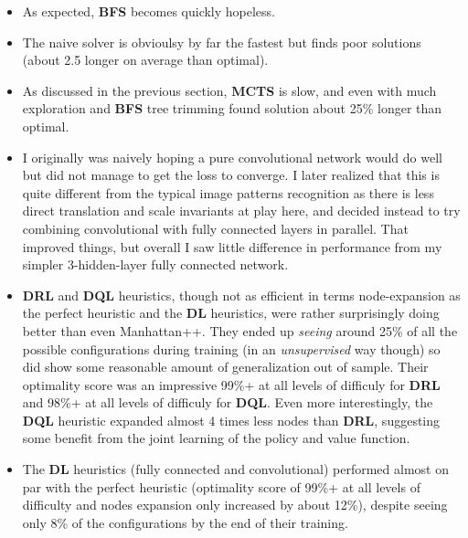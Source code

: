 \begin{itemize}
\item As expected, \textbf{BFS} becomes quickly hopeless.
\item The naive solver is obvioulsy by far the fastest but finds poor solutions (about 2.5 longer on average than optimal).
\item As discussed in the previous section, \textbf{MCTS} is slow, and even with much exploration and \textbf{BFS} tree trimming found solution about 25\% longer than optimal.
\item I originally was naively hoping a pure convolutional network would do well but did not manage to get the loss to converge. I later realized that this is quite different from the typical image patterns recognition as there is less direct translation and scale invariants at play here, and decided instead to try combining convolutional with fully connected layers in parallel. That improved things, but overall I saw little difference in performance from my simpler 3-hidden-layer fully connected network.
\item \textbf{DRL} and \textbf{DQL} heuristics, though not as efficient in terms node-expansion as the perfect heuristic and the \textbf{DL} heuristics, were rather surprisingly doing better than even Manhattan++. They ended up \textit{seeing} around 25\% of all the possible configurations during training (in an \textit{unsupervised} way though) so did show some reasonable amount of generalization out of sample. Their optimality score was an impressive 99\%+ at all levels of difficuly for \textbf{DRL} and 98\%+ at all levels of difficuly for \textbf{DQL}. Even more interestingly, the \textbf{DQL} heuristic expanded almost 4 times less nodes than \textbf{DRL}, suggesting some benefit from the joint learning of the policy and value function.
\item The \textbf{DL} heuristics (fully connected and convolutional) performed almost on par with the perfect heuristic (optimality score of 99\%+ at all levels of difficulty and nodes expansion only increased by about 12\%), despite seeing only 8\% of the configurations by the end of their training.
\end{itemize}


